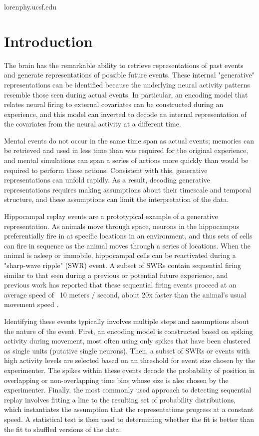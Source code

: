 \documentclass[times, twoside]{zHenriquesLab-StyleBioRxiv}
\begin{document}
\begin{corrauthor}
loren\at phy.ucsf.edu
\end{corrauthor}

\section*{Introduction}
The brain has the remarkable ability to retrieve representations of past events and generate representations of possible future events. These internal "generative" representations can be identified because the underlying neural activity patterns resemble those seen during actual events. In particular, an encoding model that relates neural firing to external covariates can be constructed during an experience, and this model can inverted to decode an internal representation of the covariates from the neural activity at a different time.

Mental events do not occur in the same time span as actual events; memories can be retrieved and used in less time than was required for the original experience, and mental simulations can span a series of actions more quickly than would be required to perform those actions. Consistent with this, generative representations can unfold rapidly. As a result, decoding generative representations requires making assumptions about their timescale and temporal structure, and these assumptions can limit the interpretation of the data. 

Hippocampal replay events are a prototypical example of a generative representation. As animals move through space, neurons in the hippocampus preferentially fire in at specific locations in an environment, and thus sets of cells can fire in sequence as the animal moves through a series of locations. When the animal is asleep or immobile, hippocampal cells can be reactivated during a "sharp-wave ripple" (SWR) event. A subset of SWRs contain sequential firing similar to that seen during a previous or potential future experience, and previous work has reported that these sequential firing events proceed at an average speed of ~10 meters / second, about 20x faster than the animal's usual movement speed \cite{DavidsonHippocampalReplayExtended2009}. 

Identifying these events typically involves multiple steps and assumptions about the nature of the event. First, an encoding model is constructed based on spiking activity during movement, most often using only spikes that have been clustered as single units (putative single neurons). Then, a subset of SWRs or events with high activity levels are selected based on an threshold for event size chosen by the experimenter. The spikes within these events decode the probability of position in overlapping or non-overlapping time bins whose size is also chosen by the experimenter. Finally, the most commonly used approach to detecting sequential replay involves fitting a line to the resulting set of probability distributions, which instantiates the assumption that the representations progress at a constant speed. A statistical test is then used to determining whether the fit is better than the fit to shuffled versions of the data.
\end{document}

